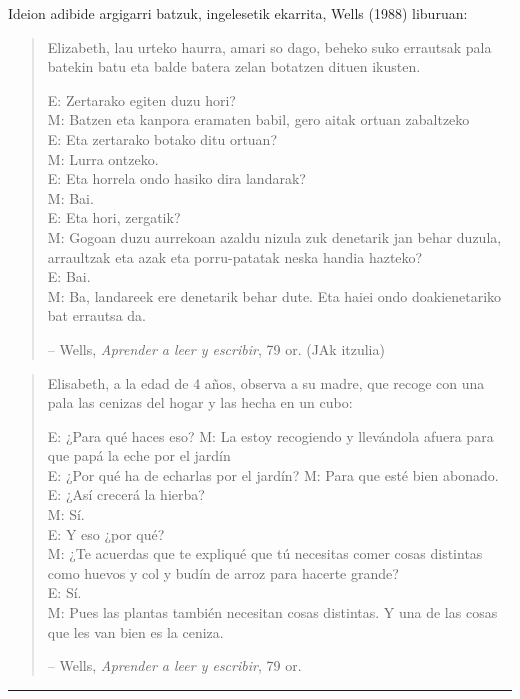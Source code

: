 \documentclass[
]{book}
\begin{document}
Ideion adibide argigarri batzuk, ingelesetik ekarrita, Wells (1988) liburuan:

\begin{quote}
Elizabeth, lau urteko haurra, amari so dago, beheko suko errautsak pala batekin batu eta balde batera zelan botatzen dituen ikusten.

E: Zertarako egiten duzu hori?\\
M: Batzen eta kanpora eramaten babil, gero aitak ortuan zabaltzeko\\
E: Eta zertarako botako ditu ortuan?\\
M: Lurra ontzeko.\\
E: Eta horrela ondo hasiko dira landarak?\\
M: Bai.\\
E: Eta hori, zergatik?\\
M: Gogoan duzu aurrekoan azaldu nizula zuk denetarik jan behar duzula, arraultzak eta azak eta porru-patatak neska handia hazteko?\\
E: Bai.\\
M: Ba, landareek ere denetarik behar dute. Eta haiei ondo doakienetariko bat errautsa da.

-- Wells, \emph{Aprender a leer y escribir}, 79 or. (JAk itzulia)
\end{quote}

\begin{quote}
Elisabeth, a la edad de 4 años, observa a su madre, que recoge con una pala las cenizas del hogar y las hecha en un cubo:

E: ¿Para qué haces eso?
M: La estoy recogiendo y llevándola afuera para que papá la eche por el jardín\\
E: ¿Por qué ha de echarlas por el jardín?
M: Para que esté bien abonado.\\
E: ¿Así crecerá la hierba?\\
M: Sí.\\
E: Y eso ¿por qué?\\
M: ¿Te acuerdas que te expliqué que tú necesitas comer cosas distintas como huevos y col y budín de arroz para hacerte grande?\\
E: Sí.\\
M: Pues las plantas también necesitan cosas distintas. Y una de las cosas que les van bien es la ceniza.

-- Wells, \emph{Aprender a leer y escribir}, 79 or.
\end{quote}

\begin{center}\rule{0.5\linewidth}{0.5pt}\end{center}
\end{document}
